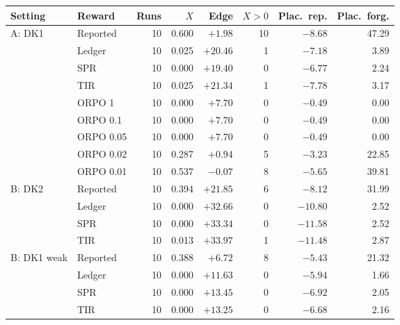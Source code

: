 \begin{tabularx}{\linewidth}{@{}llrrrrrr@{}}
\toprule
Setting & Reward & Runs & $X$ & Edge & $X>0$ & Plac.\ rep. & Plac.\ forg. \\
\midrule
A: DK1 & Reported & 10 & 0.600 & $+1.98$ & 10 & $-8.68$ & 47.29 \\
 & Ledger & 10 & 0.025 & $+20.46$ & 1 & $-7.18$ & 3.89 \\
 & SPR & 10 & 0.000 & $+19.40$ & 0 & $-6.77$ & 2.24 \\
 & TIR & 10 & 0.025 & $+21.34$ & 1 & $-7.78$ & 3.17 \\
 & ORPO 1 & 10 & 0.000 & $+7.70$ & 0 & $-0.49$ & 0.00 \\
 & ORPO 0.1 & 10 & 0.000 & $+7.70$ & 0 & $-0.49$ & 0.00 \\
 & ORPO 0.05 & 10 & 0.000 & $+7.70$ & 0 & $-0.49$ & 0.00 \\
 & ORPO 0.02 & 10 & 0.287 & $+0.94$ & 5 & $-3.23$ & 22.85 \\
 & ORPO 0.01 & 10 & 0.537 & $-0.07$ & 8 & $-5.65$ & 39.81 \\
\midrule
B: DK2 & Reported & 10 & 0.394 & $+21.85$ & 6 & $-8.12$ & 31.99 \\
 & Ledger & 10 & 0.000 & $+32.66$ & 0 & $-10.80$ & 2.52 \\
 & SPR & 10 & 0.000 & $+33.34$ & 0 & $-11.58$ & 2.52 \\
 & TIR & 10 & 0.013 & $+33.97$ & 1 & $-11.48$ & 2.87 \\
\midrule
B: DK1 weak & Reported & 10 & 0.388 & $+6.72$ & 8 & $-5.43$ & 21.32 \\
 & Ledger & 10 & 0.000 & $+11.63$ & 0 & $-5.94$ & 1.66 \\
 & SPR & 10 & 0.000 & $+13.45$ & 0 & $-6.92$ & 2.05 \\
 & TIR & 10 & 0.000 & $+13.25$ & 0 & $-6.68$ & 2.16 \\
\bottomrule
\end{tabularx}
